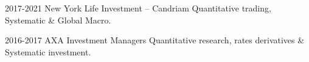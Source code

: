 

\begin{center}
\end{center}
\begin{cvskills}

  \cvskill
    {2017-2021} %
    {New York Life Investment -- Candriam} %
    {Quantitative trading, Systematic \& Global Macro.} %

  \cvskill
    {2016-2017} %
    {AXA Investment Managers} %
    {Quantitative research, rates derivatives \& Systematic investment.} 


\end{cvskills}


